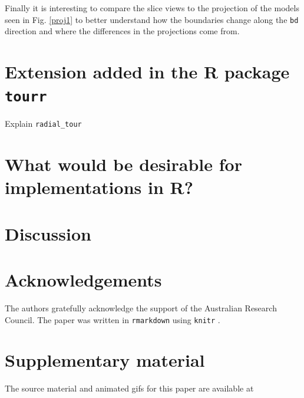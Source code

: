 \documentclass[]{interact}
\theoremstyle{plain}%
\theoremstyle{definition}
\theoremstyle{remark}
\begin{document}
Finally it is interesting to compare the slice views to the projection
of the models seen in Fig. \ref{proj1} to better understand how the
boundaries change along the \texttt{bd} direction and where the
differences in the projections come from.

\hypertarget{extension-added-in-the-r-package-tourr}{%
\section{\texorpdfstring{Extension added in the R package
\texttt{tourr}}{Extension added in the R package tourr}}\label{extension-added-in-the-r-package-tourr}}

Explain \texttt{radial\_tour}

\hypertarget{what-would-be-desirable-for-implementations-in-r}{%
\section{What would be desirable for implementations in
R?}\label{what-would-be-desirable-for-implementations-in-r}}

\hypertarget{sec:discussion}{%
\section{Discussion}\label{sec:discussion}}

\hypertarget{acknowledgements}{%
\section*{Acknowledgements}\label{acknowledgements}}

The authors gratefully acknowledge the support of the Australian
Research Council. The paper was written in \texttt{rmarkdown}
\citep{rmarkdown} using \texttt{knitr} \citep{knitr}.

\hypertarget{supplementary-material}{%
\section*{Supplementary material}\label{supplementary-material}}

The source material and animated gifs for this paper are available at



\end{document}
